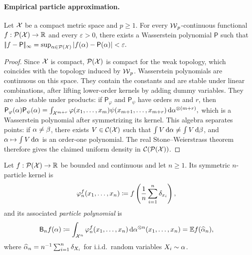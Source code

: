 \paragraph{Empirical particle approximation.}
\begin{prop}\label{prop-density-wasserstein-polynomials}
Let \(\mathcal{X}\) be a compact metric space and \(p\geq1\). For every \(\operatorname{\mathcal{W}}_p\)-continuous functional \(f:\mathcal{P}(\mathcal{X})\to\mathbb{R}\) and every \(\varepsilon>0\), there exists a Wasserstein polynomial \(\mathsf P\) such that
\(|\!| f-\mathsf P |\!|_{\infty} = \sup_{\alpha\in\mathcal{P}(\mathcal{X})}|f(\alpha)-\mathsf P(\alpha)| <\varepsilon.\)
\end{prop}
\begin{proof}
Since \(\mathcal{X}\) is compact, \(\mathcal{P}(\mathcal{X})\) is compact for the weak topology, which coincides with the topology induced by \(\operatorname{\mathcal{W}}_p\). Wasserstein polynomials are continuous on this space. They contain the constants and are stable under linear combinations, after lifting lower-order kernels by adding dummy variables. They are also stable under products: if \(\mathsf P_\varphi\) and \(\mathsf P_\psi\) have orders \(m\) and \(r\), then
\(\mathsf P_\varphi(\alpha)\mathsf P_\psi(\alpha) = \int_{\mathcal{X}^{m+r}} \varphi(x_1,\ldots,x_m)\psi(x_{m+1},\ldots,x_{m+r}) \,\mathrm{d}\alpha^{\otimes(m+r)},\)
which is a Wasserstein polynomial after symmetrizing its kernel. This algebra separates points: if \(\alpha\neq\beta\), there exists \(V\in\mathcal C(\mathcal{X})\) such that \(\int V\,\mathrm{d}\alpha\neq\int V\,\mathrm{d}\beta\), and \(\alpha\mapsto\int V\,\mathrm{d}\alpha\) is an order-one polynomial. The real Stone--Weierstrass theorem therefore gives the claimed uniform density in \(\mathcal C(\mathcal{P}(\mathcal{X}))\).
\end{proof}
\begin{defn}\label{def-particle-polynomial}
Let \(f:\mathcal{P}(\mathcal{X})\to\mathbb{R}\) be bounded and continuous and let \(n\geq1\). Its symmetric \(n\)-particle kernel is
\[
\varphi_n^f(x_1,\ldots,x_n)
\coloneqq
f\left(\frac1n\sum_{i=1}^n\delta_{x_i}\right),
\]
and its associated \emph{particle polynomial} is
\begin{equation}\label{eq-empirical-particle-polynomial}
\mathsf B_n f(\alpha)
\coloneqq
\int_{\mathcal{X}^n}\varphi_n^f(x_1,\ldots,x_n)
\,\mathrm{d}\alpha^{\otimes n}(x_1,\ldots,x_n)
=
\mathbb{E} f(\widehat{\alpha}_n),
\end{equation}
where \(\widehat{\alpha}_n=n^{-1}\sum_{i=1}^n\delta_{X_i}\) for i.i.d.\ random variables \(X_i\sim\alpha\).
\end{defn}
